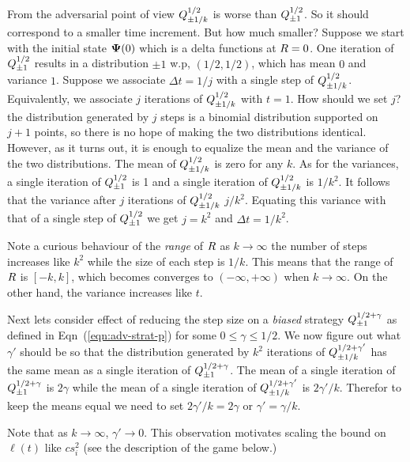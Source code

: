 \documentclass{article}[12pt]
\begin{document}
From the adversarial point of view $Q^{1/2}_{\pm 1/k}$ is worse
than $Q^{1/2}_{\pm 1}$. So it should correspond to a smaller
time increment. But how much smaller? Suppose we start with the
initial state ${\bf \Psi}(0)$ which is a delta functions at $R=0$.  One
iteration of $Q^{1/2}_{\pm 1}$ results in a distribution
$\pm 1$ w.p, $(1/2,1/2)$, which has mean $0$ and variance $1$.
Suppose we associate $\Delta t =1/j$ with a single step of
$Q^{1/2}_{\pm 1/k}$.  Equivalently, we associate $j$ iterations
of $Q^{1/2}_{\pm 1/k}$ with $t=1$.  How should we set $j$? the
distribution generated by $j$ steps is a binomial distribution
supported on $j+1$ points, so there is no hope of making the two
distributions identical. However, as it turns out, it is enough to
equalize the mean and the variance of the two distributions. The mean
of $Q^{1/2}_{\pm 1/k}$ is zero for any $k$. As for the
variances, a single iteration of $Q^{1/2}_{\pm 1}$ is 1 and a
single iteration of $Q^{1/2}_{\pm 1/k}$ is $1/k^2$. It follows
that the variance after $j$ iterations of $Q^{1/2}_{\pm 1/k}$
$j/k^2$. Equating this variance with that of a single step of
$Q^{1/2}_{\pm 1}$ we get $j=k^2$ and $\Delta t= 1/k^2$.

Note a curious behaviour of the {\em range} of $R$ as $k \to \infty$
the number of steps increases like $k^2$ while the size of each step
is $1/k$. This means that the range of $R$ is $[-k,k]$, which becomes
converges to $(-\infty, + \infty)$ when $k \to \infty$. On the other
hand, the variance increases like $t$.

Next lets consider effect of reducing the step size on a {\em biased}
strategy $Q^{1/2+\gamma}_{\pm 1}$ as defined in
Eqn~(\ref{eqn:adv-strat-p}) for some
$0\leq \gamma \leq 1/2$.  We now figure out what  $\gamma'$ should be
so that the distribution generated by $k^2$ iterations of $Q^{1/2+\gamma'}_{\pm 1/k}$ has the
same mean as a single iteration of $Q^{1/2+\gamma}_{\pm
  1}$. The mean of a single iteration of
$Q^{1/2+\gamma}_{\pm 1}$ is $2\gamma$ while the mean of a
single iteration of $Q^{1/2+\gamma'}_{\pm 1/k}$ is
$2\gamma'/k$. Therefor to keep the means equal we need to set
$2\gamma'/k = 2\gamma$ or $\gamma' = \gamma/k$.


Note that as $k \to \infty$, $\gamma' \to 0$. This observation
motivates scaling the bound on $\ell(t)$ like $c s_i^2$ (see the
description of the game below.)
\end{document}
